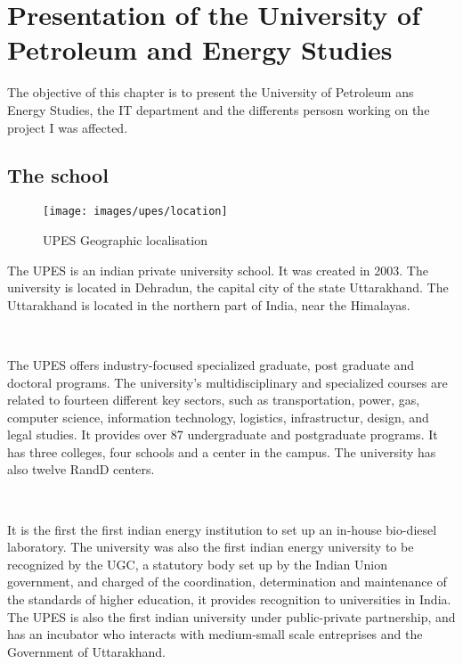 \chapter[Presentation of the UPES]{Presentation of the University of Petroleum and Energy Studies}

The objective of this chapter is to present the University of Petroleum ans Energy Studies, the IT department and the differents persosn working on the project I was affected.

\section{The school}


\begin{wrapfigure}{r}{0.5\textwidth}
	\centering
	\texttt{[image: images/upes/location]}	
	\caption{UPES Geographic localisation \cite{bib:upes:map}}
	\label{fig:upes:localisation}
\end{wrapfigure}

The \gls{UPES} is an indian private university school. It was created in 2003. The university is located in Dehradun, the capital city of the state Uttarakhand. The Uttarakhand is located in the northern part of India, near the Himalayas.  

~~

The \gls{UPES} offers industry-focused specialized graduate, post graduate and doctoral programs. The university's  multidisciplinary and specialized courses are related to fourteen  different key sectors, such as transportation, power, gas, computer science, information technology, logistics, infrastructur, design, and legal studies. It provides over 87 undergraduate and postgraduate programs. It has three colleges, four schools and a center in the campus. The university has also twelve \gls{RandD} centers. 

~~

It is the first the first indian energy institution to set up an in-house bio-diesel laboratory. The university was also the first indian energy university to be recognized by the \gls{UGC}, a statutory body set up by the Indian Union government, and charged of the coordination, determination and maintenance of the standards of higher education, it provides recognition to universities in India. The \gls{UPES} is also the first indian university under public-private partnership, and has an incubator who interacts with medium-small scale entreprises and the Government of Uttarakhand. 


